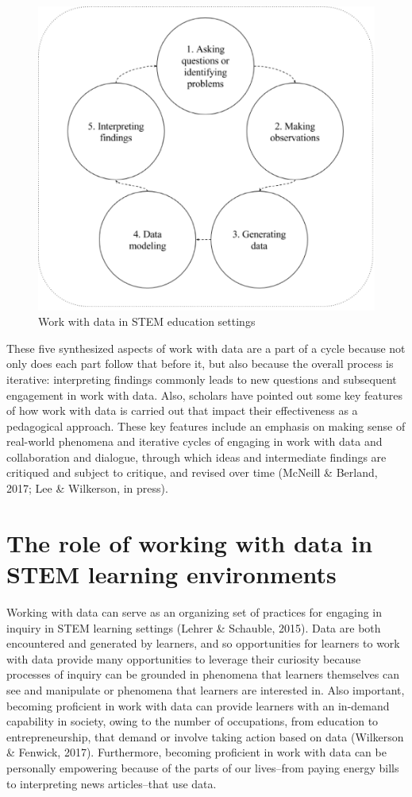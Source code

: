 \documentclass[]{book}
\theoremstyle{definition}
\theoremstyle{definition}
\theoremstyle{definition}
\theoremstyle{remark}
\begin{document}
\begin{figure}

{\centering \includegraphics[width=0.8\linewidth]{images/figure1} 

}

\caption{Work with data in STEM education settings}\label{fig:unnamed-chunk-1}
\end{figure}

These five synthesized aspects of work with data are a part of a cycle
because not only does each part follow that before it, but also because
the overall process is iterative: interpreting findings commonly leads
to new questions and subsequent engagement in work with data. Also,
scholars have pointed out some key features of how work with data is
carried out that impact their effectiveness as a pedagogical approach.
These key features include an emphasis on making sense of real-world
phenomena and iterative cycles of engaging in work with data and
collaboration and dialogue, through which ideas and intermediate
findings are critiqued and subject to critique, and revised over time
(McNeill \& Berland, 2017; Lee \& Wilkerson, in press).

\section{The role of working with data in STEM learning
environments}\label{the-role-of-working-with-data-in-stem-learning-environments}

Working with data can serve as an organizing set of practices for
engaging in inquiry in STEM learning settings (Lehrer \& Schauble,
2015). Data are both encountered and generated by learners, and so
opportunities for learners to work with data provide many opportunities
to leverage their curiosity because processes of inquiry can be grounded
in phenomena that learners themselves can see and manipulate or
phenomena that learners are interested in. Also important, becoming
proficient in work with data can provide learners with an in-demand
capability in society, owing to the number of occupations, from
education to entrepreneurship, that demand or involve taking action
based on data (Wilkerson \& Fenwick, 2017). Furthermore, becoming
proficient in work with data can be personally empowering because of the
parts of our lives--from paying energy bills to interpreting news
articles--that use data.
\end{document}
